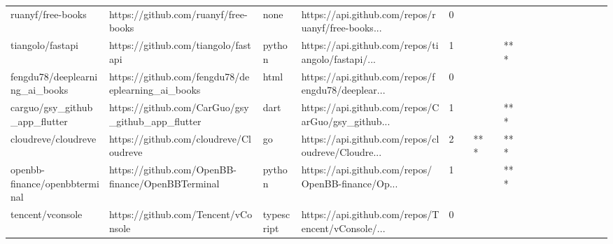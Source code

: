 \begin{tabular}{llllrlllllllllllll}
ruanyf/free-books                                  &               https://github.com/ruanyf/free-books &              none &  https://api.github.com/repos/ruanyf/free-books... &       0 &         &        &           &                &                 &        &           &           &          &          &       &              &          \\
tiangolo/fastapi                                   &                https://github.com/tiangolo/fastapi &            python &  https://api.github.com/repos/tiangolo/fastapi/... &       1 &         &        &           &            *** &                 &        &           &           &          &          &       &              &          \\
fengdu78/deeplearning\_ai\_books                     &  https://github.com/fengdu78/deeplearning\_ai\_books &              html &  https://api.github.com/repos/fengdu78/deeplear... &       0 &         &        &           &                &                 &        &           &           &          &          &       &              &          \\
carguo/gsy\_github\_app\_flutter                      &   https://github.com/CarGuo/gsy\_github\_app\_flutter &              dart &  https://api.github.com/repos/CarGuo/gsy\_github... &       1 &         &        &           &            *** &                 &        &           &           &          &          &       &              &          \\
cloudreve/cloudreve                                &             https://github.com/cloudreve/Cloudreve &                go &  https://api.github.com/repos/cloudreve/Cloudre... &       2 &         &    *** &           &            *** &                 &        &           &           &          &          &       &              &          \\
openbb-finance/openbbterminal                      &   https://github.com/OpenBB-finance/OpenBBTerminal &            python &  https://api.github.com/repos/OpenBB-finance/Op... &       1 &         &        &           &            *** &                 &        &           &           &          &          &       &              &          \\
tencent/vconsole                                   &                https://github.com/Tencent/vConsole &        typescript &  https://api.github.com/repos/Tencent/vConsole/... &       0 &         &        &           &                &                 &        &           &           &          &          &       &              &          \\

\end{tabular}
